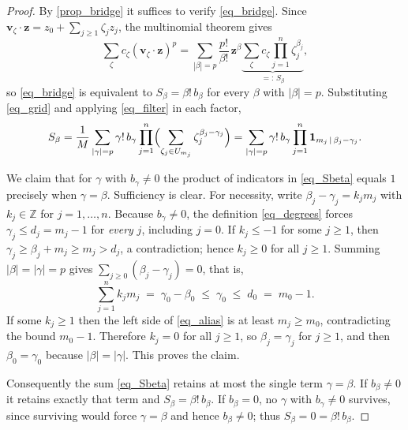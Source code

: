 \documentclass[final]{siamltex}
\newcommand{\Z}{\mathbb{Z}}
\newcommand{\bz}{\bm{z}}
\newcommand{\bv}{\bm{v}}
\newcommand{\abs}[1]{\left|#1\right|}
\begin{document}
\begin{proof}
  By \cref{prop_bridge} it suffices to verify \eqref{eq_bridge}.  Since
  $\bv_{\zeta} \cdot \bz = z_{0} + \sum_{j \ge 1}\zeta_{j}z_{j}$, the
  multinomial theorem gives
  \begin{equation*}
    \sum_{\zeta} c_{\zeta}(\bv_{\zeta}\cdot\bz)^{p}
    = \sum_{\abs{\beta}=p} \frac{p!}{\beta!}\, \bz^{\beta}
      \underbrace{\sum_{\zeta} c_{\zeta} \prod_{j=1}^{n}\zeta_{j}^{\beta_{j}}}_{=:\,S_{\beta}},
  \end{equation*}
  so \eqref{eq_bridge} is equivalent to $S_{\beta} = \beta!\,b_{\beta}$ for every
  $\beta$ with $\abs{\beta}=p$.  Substituting \eqref{eq_grid} and applying
  \eqref{eq_filter} in each factor,
  \begin{equation}\label{eq_Sbeta}
    S_{\beta}
    = \frac{1}{M}\sum_{\abs{\gamma}=p}\gamma!\,b_{\gamma}
      \prod_{j=1}^{n}\Bigl(\sum_{\zeta_{j}\in U_{m_{j}}}\zeta_{j}^{\beta_{j}-\gamma_{j}}\Bigr)
    = \sum_{\abs{\gamma}=p}\gamma!\,b_{\gamma}
      \prod_{j=1}^{n}\mathbf{1}_{m_{j}\,\mid\,\beta_{j}-\gamma_{j}} .
  \end{equation}

  We claim that for $\gamma$ with $b_{\gamma}\neq 0$ the product of indicators in
  \eqref{eq_Sbeta} equals $1$ precisely when $\gamma = \beta$.  Sufficiency is
  clear.  For necessity, write $\beta_{j}-\gamma_{j} = k_{j}m_{j}$ with
  $k_{j}\in\Z$ for $j = 1,\ldots,n$.  Because $b_{\gamma}\neq 0$, the definition
  \eqref{eq_degrees} forces $\gamma_{j} \le d_{j} = m_{j}-1$ for \emph{every}
  $j$, including $j=0$.  If $k_{j} \le -1$ for some $j \ge 1$, then
  $\gamma_{j} \ge \beta_{j}+m_{j} \ge m_{j} > d_{j}$, a contradiction; hence
  $k_{j}\ge 0$ for all $j \ge 1$.  Summing $\abs{\beta} = \abs{\gamma} = p$ gives
  $\sum_{j\ge 0}(\beta_{j}-\gamma_{j}) = 0$, that is,
  \begin{equation}\label{eq_alias}
    \sum_{j=1}^{n} k_{j}m_{j} \;=\; \gamma_{0}-\beta_{0} \;\le\; \gamma_{0} \;\le\; d_{0} \;=\; m_{0}-1 .
  \end{equation}
  If some $k_{j} \ge 1$ then the left side of \eqref{eq_alias} is at least
  $m_{j} \ge m_{0}$, contradicting the bound $m_{0}-1$.  Therefore $k_{j}=0$ for
  all $j \ge 1$, so $\beta_{j}=\gamma_{j}$ for $j\ge1$, and then
  $\beta_{0}=\gamma_{0}$ because $\abs{\beta}=\abs{\gamma}$.  This proves the
  claim.

  Consequently the sum \eqref{eq_Sbeta} retains at most the single term
  $\gamma=\beta$.  If $b_{\beta}\neq0$ it retains exactly that term and
  $S_{\beta} = \beta!\,b_{\beta}$.  If $b_{\beta}=0$, no $\gamma$ with
  $b_{\gamma}\neq0$ survives, since surviving would force $\gamma=\beta$ and
  hence $b_{\beta}\neq0$; thus $S_{\beta}=0=\beta!\,b_{\beta}$.
\end{proof}
\end{document}
